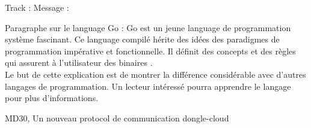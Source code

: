         Track : 
        Message : 
        


        Paragraphe sur le language Go : 
        Go est un jeune language de programmation système
        fascinant. Ce language compilé hérite des idées des paradigmes de
        programmation impérative et fonctionnelle. Il définit des concepts et
        des règles qui assurent à l'utilisateur des binaires .\\[0.3cm]
       
      
        Le but de cette explication est de montrer la différence considérable
        avec d'autres langages de programmation. Un lecteur intéressé pourra
        apprendre le langage pour plus d'informations.

        MD30, Un nouveau protocol de communication dongle-cloud